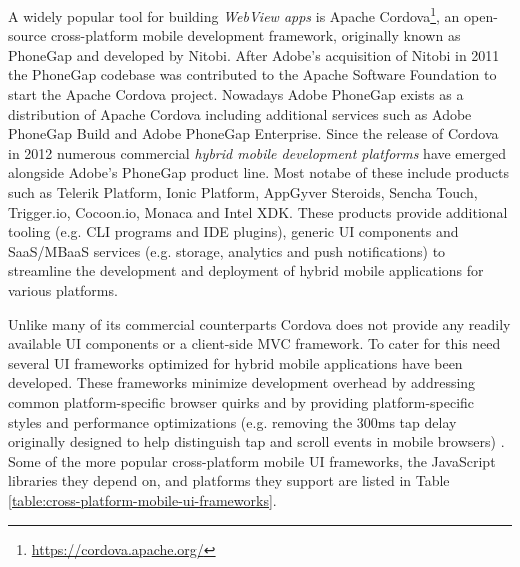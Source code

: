 \documentclass[thesis.tex]{subfiles}
\begin{document}
A widely popular tool for building \textit{WebView apps} is Apache Cordova\footnote{\url{https://cordova.apache.org/}}, an open-source cross-platform mobile development framework, originally known as PhoneGap and developed by Nitobi. After Adobe's acquisition of Nitobi in 2011 the PhoneGap codebase was contributed to the Apache Software Foundation to start the Apache Cordova project. Nowadays Adobe PhoneGap exists as a distribution of Apache Cordova including additional services such as Adobe PhoneGap Build and Adobe PhoneGap Enterprise. Since the release of Cordova in 2012 numerous commercial \textit{hybrid mobile development platforms} have emerged alongside Adobe's PhoneGap product line. Most notabe of these include products such as Telerik Platform, Ionic Platform, AppGyver Steroids, Sencha Touch, Trigger.io, Cocoon.io, Monaca and Intel XDK. These products provide additional tooling (e.g. CLI programs and IDE plugins), generic UI components and SaaS/MBaaS services (e.g. storage, analytics and push notifications) to streamline the development and deployment of hybrid mobile applications for various platforms.

Unlike many of its commercial counterparts Cordova does not provide any readily available UI components or a client-side MVC framework. To cater for this need several UI frameworks optimized for hybrid mobile applications have been developed. These frameworks minimize development overhead by addressing common platform-specific browser quirks and by providing platform-specific styles and performance optimizations (e.g. removing the 300ms tap delay originally designed to help distinguish tap and scroll events in mobile browsers) \cite{click_delay}. Some of the more popular cross-platform mobile UI frameworks, the JavaScript libraries they depend on, and platforms they support are listed in Table \ref{table:cross-platform-mobile-ui-frameworks}.
\end{document}
